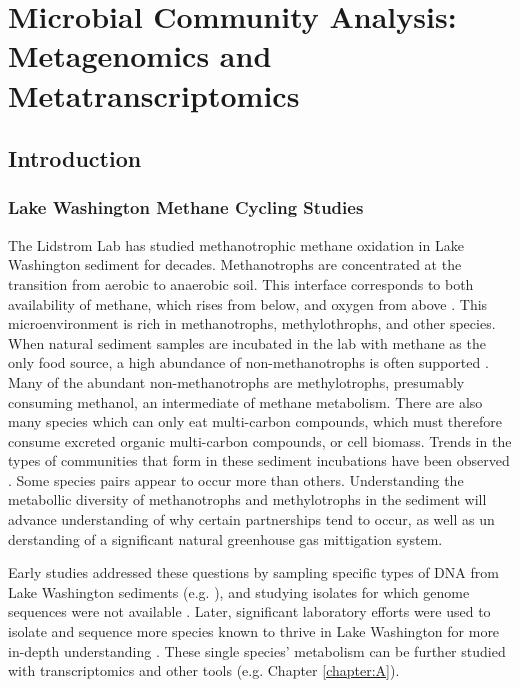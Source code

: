 \chapter{Microbial Community Analysis: Metagenomics and Metatranscriptomics}
\label{chapter:B}

\section{Introduction}
\subsection{Lake Washington Methane Cycling Studies}

The Lidstrom Lab has studied methanotrophic methane oxidation in Lake Washington sediment for decades.
Methanotrophs are concentrated at the transition from aerobic to anaerobic soil.
This interface corresponds to both availability of methane, which rises from below, and oxygen from above \cite{lidstrom1984gradients, kuivilal1988, auman2000gradients}. %
This microenvironment is rich in methanotrophs, methylothrophs, and other species.
When natural sediment samples are incubated in the lab with methane as the only food source, a high abundance of non-methanotrophs is often supported \cite{oshkin2015LW}.
Many of the abundant non-methanotrophs are methylotrophs, presumably consuming methanol, an intermediate of methane metabolism.
There are also many species which can only eat multi-carbon compounds, which must therefore consume excreted organic multi-carbon compounds, or cell biomass.
Trends in the types of communities that form in these sediment incubations have been observed  \cite{oshkin2015LW}.
Some species pairs appear to occur more than others.
Understanding the metabollic diversity of methanotrophs and methylotrophs in the sediment will advance understanding of why certain partnerships tend to occur, as well as un derstanding of a significant natural greenhouse gas mittigation system.

Early studies addressed these questions by sampling specific types of DNA from Lake Washington sediments (e.g. \cite{auman2002, costello2002, nercessian2005}), and studying isolates for which genome sequences were not available \cite{auman2000gradients, kalyuzhnaya2005Methylosarcina, kalyuzhnaya2006methylotenera}.
Later, significant laboratory efforts were used to isolate and sequence more species known to thrive in Lake Washington for more in-depth understanding
    \cite{kalyuzhnaya2011isolates, beck2015isolates, mctaggart2015, kalyuzhnaya2015}.
These single species' metabolism can be further studied with transcriptomics and other tools (e.g. Chapter \ref{chapter:A}).

